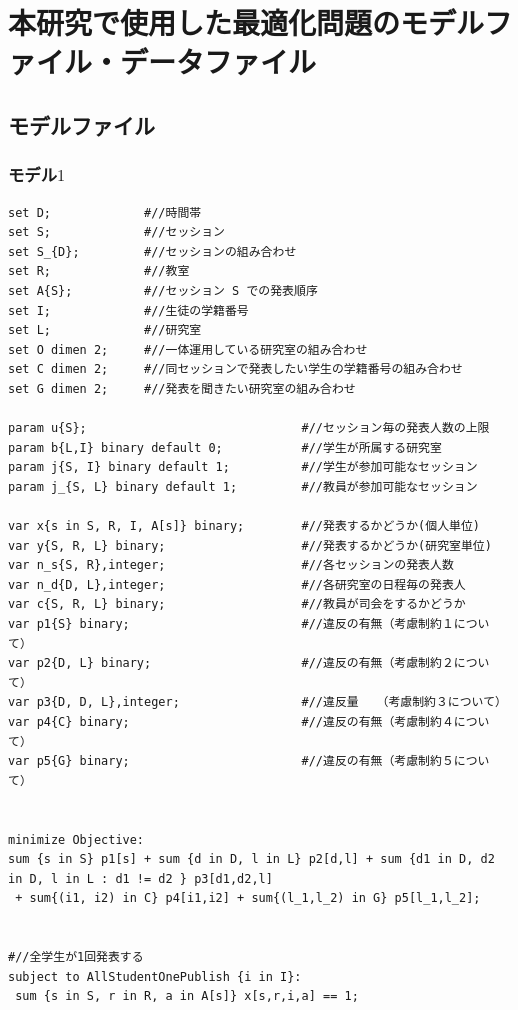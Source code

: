 \documentclass[a4paper,12pt,fleqn]{jarticle}
\begin{document}
\section{本研究で使用した最適化問題のモデルファイル・データファイル}
\subsection{モデルファイル}
\subsubsection{モデル$1$}
\begin{verbatim}
set D;             #//時間帯
set S;             #//セッション
set S_{D};         #//セッションの組み合わせ
set R;             #//教室
set A{S};          #//セッション S での発表順序
set I;             #//生徒の学籍番号
set L;             #//研究室 
set O dimen 2;     #//一体運用している研究室の組み合わせ
set C dimen 2;     #//同セッションで発表したい学生の学籍番号の組み合わせ
set G dimen 2;     #//発表を聞きたい研究室の組み合わせ

param u{S};                              #//セッション毎の発表人数の上限
param b{L,I} binary default 0;           #//学生が所属する研究室
param j{S, I} binary default 1;          #//学生が参加可能なセッション
param j_{S, L} binary default 1;         #//教員が参加可能なセッション

var x{s in S, R, I, A[s]} binary;        #//発表するかどうか(個人単位)
var y{S, R, L} binary;                   #//発表するかどうか(研究室単位)
var n_s{S, R},integer;                   #//各セッションの発表人数
var n_d{D, L},integer;                   #//各研究室の日程毎の発表人
var c{S, R, L} binary;                   #//教員が司会をするかどうか
var p1{S} binary;                        #//違反の有無（考慮制約１について）
var p2{D, L} binary;                     #//違反の有無（考慮制約２について）
var p3{D, D, L},integer;                 #//違反量　　（考慮制約３について）
var p4{C} binary;                        #//違反の有無（考慮制約４について）
var p5{G} binary;                        #//違反の有無（考慮制約５について）


minimize Objective:
sum {s in S} p1[s] + sum {d in D, l in L} p2[d,l] + sum {d1 in D, d2 in D, l in L : d1 != d2 } p3[d1,d2,l]
 + sum{(i1, i2) in C} p4[i1,i2] + sum{(l_1,l_2) in G} p5[l_1,l_2]; 


#//全学生が1回発表する
subject to AllStudentOnePublish {i in I}:
 sum {s in S, r in R, a in A[s]} x[s,r,i,a] == 1;


\end{verbatim}
\end{document}
